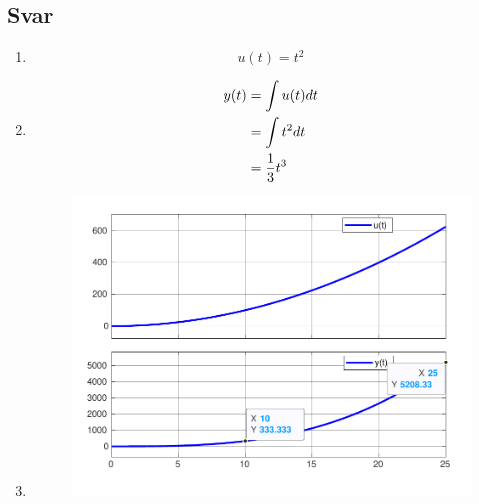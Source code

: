 \documentclass[answers,11pt]{exam}
\begin{document}
\begin{enumerate}[label=\alph*)]
\begin{tcolorbox}
  \end{tcolorbox}

  \newpage
  

  \begin{tcolorbox}
    \subsection*{Svar}

    \begin{enumerate}[label=c\arabic*)]
      \item
            \[u(t) = t^2\]

      \item
            \begin{align}
              y(t) & = \int u(t)dt \notag \\
                   & =\int t^2dt \notag   \\
                   & = \frac{1}{3}t^3
            \end{align}
      \item

            \parbox{\textwidth}{
              \begin{figure}[H]
                \centering
                \hspace*{0mm}\scalebox{0.65}
                {\includegraphics{figurer/c3.pdf}}
                \label{fig:2c}
              \end{figure}
            }


\end{enumerate}
\end{tcolorbox}
\end{enumerate}
\end{document}
